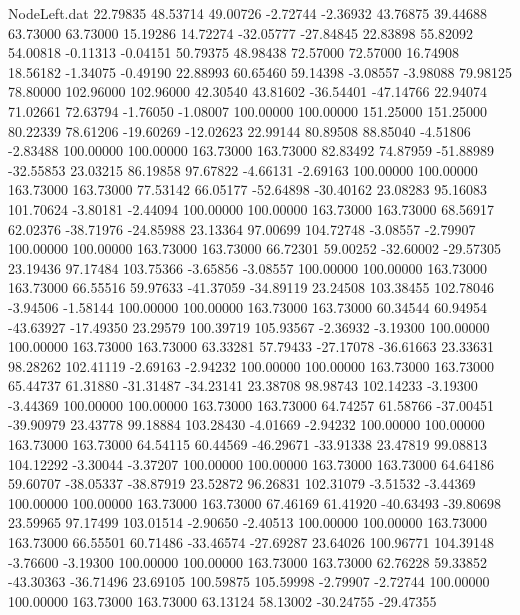 \begin{filecontents}{NodeLeft.dat}
  22.79835   48.53714   49.00726    -2.72744   -2.36932   43.76875   39.44688   63.73000   63.73000   15.19286   14.72274  -32.05777  -27.84845
  22.83898   55.82092   54.00818    -0.11313   -0.04151   50.79375   48.98438   72.57000   72.57000   16.74908   18.56182   -1.34075   -0.49190
  22.88993   60.65460   59.14398    -3.08557   -3.98088   79.98125   78.80000  102.96000  102.96000   42.30540   43.81602  -36.54401  -47.14766
  22.94074   71.02661   72.63794    -1.76050   -1.08007  100.00000  100.00000  151.25000  151.25000   80.22339   78.61206  -19.60269  -12.02623
  22.99144   80.89508   88.85040    -4.51806   -2.83488  100.00000  100.00000  163.73000  163.73000   82.83492   74.87959  -51.88989  -32.55853
  23.03215   86.19858   97.67822    -4.66131   -2.69163  100.00000  100.00000  163.73000  163.73000   77.53142   66.05177  -52.64898  -30.40162
  23.08283   95.16083  101.70624    -3.80181   -2.44094  100.00000  100.00000  163.73000  163.73000   68.56917   62.02376  -38.71976  -24.85988
  23.13364   97.00699  104.72748    -3.08557   -2.79907  100.00000  100.00000  163.73000  163.73000   66.72301   59.00252  -32.60002  -29.57305
  23.19436   97.17484  103.75366    -3.65856   -3.08557  100.00000  100.00000  163.73000  163.73000   66.55516   59.97633  -41.37059  -34.89119
  23.24508  103.38455  102.78046    -3.94506   -1.58144  100.00000  100.00000  163.73000  163.73000   60.34544   60.94954  -43.63927  -17.49350
  23.29579  100.39719  105.93567    -2.36932   -3.19300  100.00000  100.00000  163.73000  163.73000   63.33281   57.79433  -27.17078  -36.61663
  23.33631   98.28262  102.41119    -2.69163   -2.94232  100.00000  100.00000  163.73000  163.73000   65.44737   61.31880  -31.31487  -34.23141
  23.38708   98.98743  102.14233    -3.19300   -3.44369  100.00000  100.00000  163.73000  163.73000   64.74257   61.58766  -37.00451  -39.90979
  23.43778   99.18884  103.28430    -4.01669   -2.94232  100.00000  100.00000  163.73000  163.73000   64.54115   60.44569  -46.29671  -33.91338
  23.47819   99.08813  104.12292    -3.30044   -3.37207  100.00000  100.00000  163.73000  163.73000   64.64186   59.60707  -38.05337  -38.87919
  23.52872   96.26831  102.31079    -3.51532   -3.44369  100.00000  100.00000  163.73000  163.73000   67.46169   61.41920  -40.63493  -39.80698
  23.59965   97.17499  103.01514    -2.90650   -2.40513  100.00000  100.00000  163.73000  163.73000   66.55501   60.71486  -33.46574  -27.69287
  23.64026  100.96771  104.39148    -3.76600   -3.19300  100.00000  100.00000  163.73000  163.73000   62.76228   59.33852  -43.30363  -36.71496
  23.69105  100.59875  105.59998    -2.79907   -2.72744  100.00000  100.00000  163.73000  163.73000   63.13124   58.13002  -30.24755  -29.47355

\end{filecontents}

